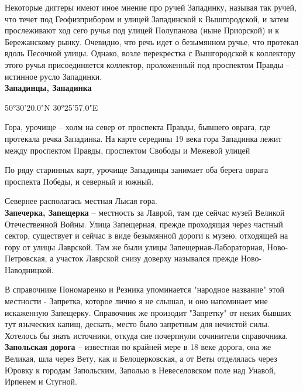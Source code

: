 Некоторые диггеры имеют иное мнение про ручей Западинку, называя так ручей, что течет под Геофизприбором и улицей Западинской к Вышгородской, и затем прослеживают ход сего ручья под улицей Полупанова (ныне Приорской) и к Бережанскому рынку. Очевидно, что речь идет о безымянном ручье, что протекал вдоль Песочной улицы. Однако, возле перекрестка с Вышгородской к коллектору этого ручья присоединяется коллектор, проложенный под проспектом Правды – истинное русло Западинки.\\


\textbf{Западинцы, Западинка}

50°30'20.0"N 30°25'57.0"E

Гора, урочище – холм на север от проспекта Правды, бывшего оврага, где протекала речка Западинка. На карте середины 19 века гора Западинка лежит между проспектом Правды, проспектом Свободы и Межевой улицей


По ряду старинных карт, урочище Западинцы занимает оба берега оврага проспекта Победы, и северный и южный.

Севернее располагась местная Лысая гора.\\

\textbf{Запечерка, Запещерка} – местность за Лаврой, там где сейчас музей Великой Отечественной Войны. Улица Запещерная, прежде проходящая через частный сектор, существует и сейчас в виде безымянной дороги к музею, отходящей на гору от улицы Лаврской. Там же были улицы Запещерная-Лабораторная, Ново-Петровская, а участок Лаврской снизу доверху назывался прежде Ново-Наводницкой.

В справочнике Пономаренко и Резника упоминается "народное название" этой местности - Запретка, которое лично я не слышал, и оно напоминает мне искаженную Запещерку. Справочник же произодит "Запретку" от неких бывших тут языческих капищ, дескать, место было запретным для нечистой силы. Хотелось бы знать источники, откуда сие почерпнули сочинители справочника.\\

\textbf{Запольская дорога} – известная по крайней мере в 18 веке дорога, она же Великая, шла через Вету, как и Белоцерковская, а от Веты отделялась через Юровку к городам Запольским, Заполью в Невеселовском поле над Унавой, Ирпенем и Стугной.\\


